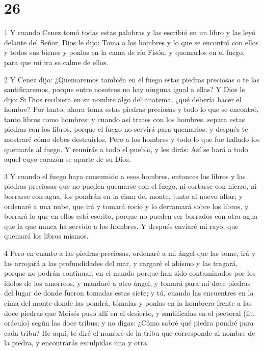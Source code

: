 \chapter{26}

\par 1 Y cuando Cenez tomó todas estas palabras y las escribió en un libro y las leyó delante del Señor, Dios le dijo: Toma a los hombres y lo que se encontró con ellos y todos sus bienes y ponlos en la cama de río Fisón, y quemarlos en el fuego, para que mi ira se calme de ellos.

\par 2 Y Cenez dijo: ¿Quemaremos también en el fuego estas piedras preciosas o te las santificaremos, porque entre nosotros no hay ninguna igual a ellas? Y Dios le dijo: Si Dios recibiera en su nombre algo del anatema, ¿qué debería hacer el hombre? Por tanto, ahora toma estas piedras preciosas y todo lo que se encontró, tanto libros como hombres: y cuando así trates con los hombres, separa estas piedras con los libros, porque el fuego no servirá para quemarlos, y después te mostraré cómo debes destruirlos. Pero a los hombres y todo lo que fue hallado los quemarás al fuego. Y reunirás a todo el pueblo, y les dirás: Así se hará a todo aquel cuyo corazón se aparte de su Dios.

\par 3 Y cuando el fuego haya consumido a esos hombres, entonces los libros y las piedras preciosas que no pueden quemarse con el fuego, ni cortarse con hierro, ni borrarse con agua, los pondrán en la cima del monte, junto al nuevo altar; y ordenaré a una nube, que irá y tomará rocío y lo derramará sobre los libros, y borrará lo que en ellos está escrito, porque no pueden ser borrados con otra agua que la que nunca ha servido a los hombres. Y después enviaré mi rayo, que quemará los libros mismos.

\par 4 Pero en cuanto a las piedras preciosas, ordenaré a mi ángel que las tome, irá y las arrojará a las profundidades del mar, y cargaré el abismo y las tragará, porque no podrán continuar. en el mundo porque han sido contaminados por los ídolos de los amorreos, y mandaré a otro ángel, y tomará para mí doce piedras del lugar de donde fueron tomadas estas siete; y tú, cuando las encuentres en la cima del monte donde las pondrá, tómalas y ponlas en la hombrera frente a las doce piedras que Moisés puso allí en el desierto, y santifícalas en el pectoral (lit. oráculo) según las doce tribus; y no digas: ¿Cómo sabré qué piedra pondré para cada tribu? He aquí, te diré el nombre de la tribu que corresponde al nombre de la piedra, y encontrarás esculpidas una y otra.

